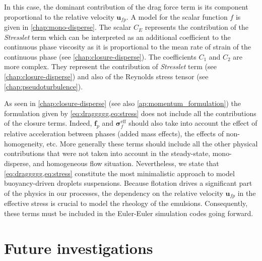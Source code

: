 In this case, the dominant contribution of the drag force term is its component proportional to the relative velocity $\textbf{u}_{fp}$. 
A model for the scalar function $f$ is given in \ref{chap:mono-disperse}. 
The scalar $C_E$ represents the contribution of the \textit{Stresslet} term which can be interpreted as an additional coefficient to the continuous phase viscosity as it is proportional to the mean rate of strain of the continuous phase (see \ref{chap:closure-disperse}).
The coefficients $C_1$ and $C_2$ are more complex. 
They represent the contribution of \textit{Stresslet} term (see \ref{chap:closure-disperse}) and also of the Reynolds stress tensor (see \ref{chap:pseudoturbulence}). 



As seen in \ref{chap:closure-disperse} (see also \ref{ap:momentum_formulation}) the formulation given by \ref{eq:draggggg,eq:stress} does not include all the contributions of the closure terms. 
Indeed, $\textbf{f}_p$ and $\bm\sigma_f^\text{eff}$ should also take into account the effect of relative acceleration between phases (added mass effects), the effects of non-homogeneity, etc.
More generally these terms should include all the other physical contributions that were not taken into account in the steady-state, mono-disperse, and homogeneous flow situation. 
Nevertheless, we state that \ref{eq:draggggg,eq:stress} constitute the most minimalistic approach to model buoyancy-driven droplets suspensions. 
Because flotation drives a significant part of the physics in our processes, the dependency on the relative velocity $\textbf{u}_{fp}$ in the effective stress is crucial to model the rheology of the emulsions.
Consequently, these terms must be included in the Euler-Euler simulation codes going forward.


\chapter*{Future investigations}




